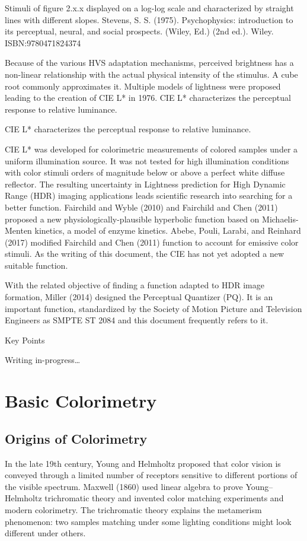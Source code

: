 Stimuli of figure 2.x.x displayed on a log-log scale and characterized by straight lines with different slopes. Stevens, S. S. (1975). Psychophysics: introduction to its perceptual, neural, and social prospects. (Wiley, Ed.) (2nd ed.). Wiley. ISBN:9780471824374

Because of the various HVS adaptation mechanisms, perceived brightness has a non-linear relationship with the actual physical intensity of the stimulus. A cube root commonly approximates it. Multiple models of lightness were proposed leading to the creation of CIE L* in 1976. CIE L* characterizes the perceptual response to relative luminance.


CIE L* characterizes the perceptual response to relative luminance.

CIE L* was developed for colorimetric measurements of colored samples under a uniform illumination source. It was not tested for high illumination conditions with color stimuli orders of magnitude below or above a perfect white diffuse reflector. The resulting uncertainty in Lightness prediction for High Dynamic Range (HDR) imaging applications leads scientific research into searching for a better function. Fairchild and Wyble (2010) and Fairchild and Chen (2011) proposed a new physiologically-plausible hyperbolic function based on Michaelis-Menten kinetics, a model of enzyme kinetics. Abebe, Pouli, Larabi, and Reinhard (2017) modified Fairchild and Chen (2011) function to account for emissive color stimuli. As the writing of this document, the CIE has not yet adopted a new suitable function.

With the related objective of finding a function adapted to HDR image formation, Miller (2014) designed the Perceptual Quantizer (PQ). It is an important function, standardized by the Society of Motion Picture and Television Engineers as SMPTE ST 2084 and this document frequently refers to it.

Key Points

Writing in-progress…


\section{Basic Colorimetry}

\subsection{Origins of Colorimetry}

In the late 19th century, Young and Helmholtz proposed that color vision is conveyed through a limited number of receptors sensitive to different portions of the visible spectrum. Maxwell (1860) used linear algebra to prove Young–Helmholtz trichromatic theory and invented color matching experiments and modern colorimetry. The trichromatic theory explains the metamerism phenomenon: two samples matching under some lighting conditions might look different under others.


